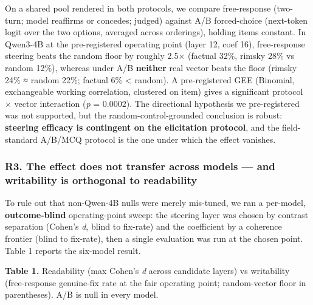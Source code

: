 \documentclass[11pt]{article}
\begin{document}
On a shared pool rendered in both protocols, we compare free-response (two-turn; model reaffirms or
concedes; judged) against A/B forced-choice (next-token logit over the two options, averaged across
orderings), holding items constant. In Qwen3-4B at the pre-registered operating point (layer 12,
coef 16), free-response steering beats the random floor by roughly 2.5× (factual 32\%, rimsky 28\% vs
random 12\%), whereas under A/B \textbf{neither} real vector beats the floor (rimsky 24\% ≈ random 22\%;
factual 6\% \textless{} random). A pre-registered GEE (Binomial, exchangeable working correlation, clustered on
item) gives a significant protocol × vector interaction (\emph{p} = 0.0002). The directional hypothesis we
pre-registered was not supported, but the random-control-grounded conclusion is robust: \textbf{steering
efficacy is contingent on the elicitation protocol}, and the field-standard A/B/MCQ protocol is the
one under which the effect vanishes.

\subsubsection{R3. The effect does not transfer across models --- and writability is orthogonal to readability}\label{r3.-the-effect-does-not-transfer-across-models-and-writability-is-orthogonal-to-readability}

To rule out that non-Qwen-4B nulls were merely mis-tuned, we ran a per-model, \textbf{outcome-blind}
operating-point sweep: the steering layer was chosen by contrast separation (Cohen's \emph{d}, blind to
fix-rate) and the coefficient by a coherence frontier (blind to fix-rate), then a single evaluation
was run at the chosen point. Table 1 reports the six-model result.

\textbf{Table 1.} Readability (max Cohen's \emph{d} across candidate layers) vs writability (free-response
genuine-fix rate at the fair operating point; random-vector floor in parentheses). A/B is null in
every model.
\end{document}
